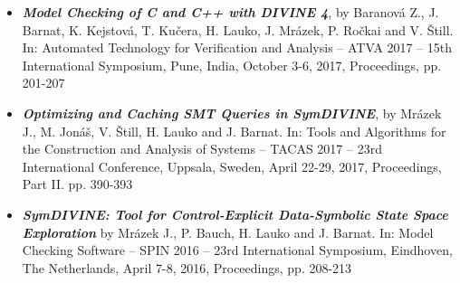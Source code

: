 \begin{itemize}

\item \textbf{\emph{Model Checking of C and C++ with DIVINE 4}},
by Baranová Z., J. Barnat, K. Kejstová, T. Kučera, H. Lauko, J. Mrázek, P. Ročkai and V. Štill.
In: Automated Technology for Verification and Analysis -- ATVA 2017 --
15th International Symposium, Pune, India, October 3-6, 2017,
Proceedings, pp. 201-207~\cite{Divine17}


\item \emph{\textbf{Optimizing and Caching SMT Queries in SymDIVINE}},
by Mrázek J., M. Jonáš, V. Štill, H. Lauko and J. Barnat.
In: Tools and Algorithms for the Construction and Analysis of Systems -- TACAS 2017 --
23rd International Conference, Uppsala, Sweden, April 22-29, 2017,
Proceedings, Part II. pp. 390-393~\cite{Mrazek2017}


\item \textbf{\emph{\textsf{SymDIVINE}: Tool for Control-Explicit Data-Symbolic State Space Exploration}}
by Mrázek J., P. Bauch, H. Lauko and J. Barnat.
In: Model Checking Software -- SPIN 2016 -- 23rd International Symposium, Eindhoven, The Netherlands, April 7-8, 2016, Proceedings, pp. 208-213~\cite{Mrazek2016}


\end{itemize}
